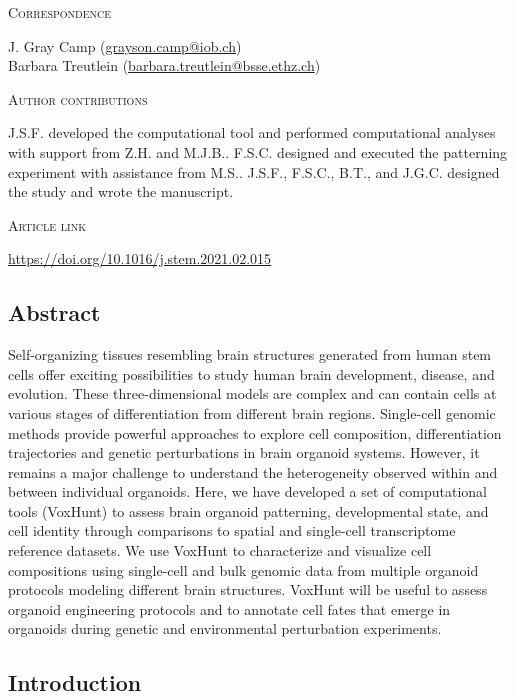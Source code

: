 \noindent
{\large\textsc{Correspondence}} 

\noindent
J. Gray Camp (\href{mailto:grayson.camp@iob.ch}{grayson.camp@iob.ch})\\
Barbara Treutlein (\href{mailto:barbara.treutlein@bsse.ethz.ch}{barbara.treutlein@bsse.ethz.ch})
\vspace{1cm}

\noindent
{\large\textsc{Author contributions}}

\noindent
J.S.F. developed the computational tool and performed computational analyses with support from Z.H. and M.J.B.. F.S.C. designed and executed the patterning experiment with assistance from M.S.. J.S.F., F.S.C., B.T., and J.G.C. designed the study and wrote the manuscript.

\vspace{1cm}

\noindent
{\large\textsc{Article link}} 

\noindent
\href{https://doi.org/10.1016/j.stem.2021.02.015}{https://doi.org/10.1016/j.stem.2021.02.015}


\subsection{Abstract}

Self-organizing tissues resembling brain structures generated from human stem cells offer exciting possibilities to study human brain development, disease, and evolution. These three-dimensional models are complex and can contain cells at various stages of differentiation from different brain regions. Single-cell genomic methods provide powerful approaches to explore cell composition, differentiation trajectories and genetic perturbations in brain organoid systems. However, it remains a major challenge to understand the heterogeneity observed within and between individual organoids. Here, we have developed a set of computational tools (VoxHunt) to assess brain organoid patterning, developmental state, and cell identity through comparisons to spatial and single-cell transcriptome reference datasets. We use VoxHunt to characterize and visualize cell compositions using single-cell and bulk genomic data from multiple organoid protocols modeling different brain structures. VoxHunt will be useful to assess organoid engineering protocols and to annotate cell fates that emerge in organoids during genetic and environmental perturbation experiments.


\subsection{Introduction}

